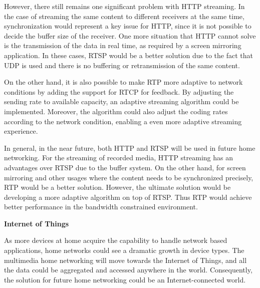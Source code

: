 However, there still remains one significant problem with HTTP streaming. In the
case of streaming the same content to different receivers at the same time,
synchronization would represent a key issue for HTTP, since it is not possible
to decide the buffer size of the receiver. One more situation that HTTP cannot
solve is the transmission of the data in real time, as required by a screen
mirroring application. In these cases, RTSP would be a better solution due to
the fact that UDP is used and there is no buffering or retransmission of the
same content.

On the other hand, it is also possible to make RTP more adaptive to network
conditions by adding the support for RTCP for feedback. By adjusting the
sending rate to available capacity, an adaptive streaming algorithm could be
implemented. Moreover, the algorithm could also adjust the coding rates
according to the network condition, enabling a even more adaptive streaming
experience.

In general, in the near future, both HTTP and RTSP will be used in future home
networking. For the streaming of recorded media, HTTP streaming has an
advantages over RTSP due to the buffer system. On the other hand, for screen
mirroring and other usages where the content needs to be synchronized
precisely, RTP would be a better solution. However, the ultimate solution would
be developing a more adaptive algorithm on top of RTSP. Thus RTP would
achieve better performance in the bandwidth constrained environment.

\textbf{Internet of Things}

As more devices at home acquire the capability to handle network based
applications, home networks could see a dramatic growth in device types. The
multimedia home networking will move towards the Internet of Things, and all
the data could be aggregated and accessed anywhere in the world. Consequently,
the solution for future home networking could be an Internet-connected
world.
